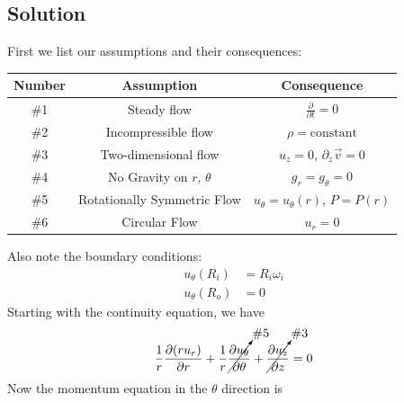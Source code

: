 \subsection*{Solution}
First we list our assumptions and their consequences:
\begin{table}[h]
    \centering
    \begin{tabular}{ccc}
        \toprule
        Number & Assumption & Consequence \\
        \hline
        \#1 & Steady flow & $\frac{\partial}{\partial t} = 0$ \\
        \#2 & Incompressible flow & $\rho = \text{constant}$ \\
        \#3 & Two-dimensional flow & $u_z = 0$, $\partial_z \vec{v} = 0$ \\
        \#4 & No Gravity on $r$, $\theta$ & $g_r = g_{\theta} = 0$ \\
        \#5 & Rotationally Symmetric Flow & $u_{\theta} = u_{\theta}(r)$, $P = P(r)$ \\
        \#6 & Circular Flow & $u_r = 0$ \\
        \bottomrule
    \end{tabular}
\end{table}
Also note the boundary conditions:
\begin{align*}
    u_{\theta}(R_i) &= R_i \omega_i \\
    u_{\theta}(R_o) &= 0
\end{align*}
Starting with the continuity equation, we have
\begin{align*}
    \frac{1}{r} \frac{\partial (r u_r)}{\partial r} + \frac{1}{r} \cancelto{\text{\#5}}{\frac{\partial u_{\theta}}{\partial \theta}} + \cancelto{\text{\#3}}{\frac{\partial u_z}{\partial z}} = 0
\end{align*}
Now the momentum equation in the $\theta$ direction is
